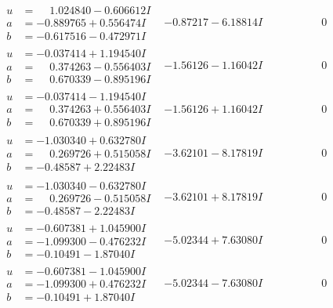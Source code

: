 \documentclass[1p]{elsarticle_modified}
\theoremstyle{definition}
\begin{document}
$$\begin{array}{c|c|c}
\begin{aligned}
u &= \phantom{-}1.024840 - 0.606612 I \\
a &= -0.889765 + 0.556474 I \\
b &= -0.617516 - 0.472971 I\end{aligned}
 & -0.87217 - 6.18814 I & \phantom{-0.000000 } 0 \\ \hline\begin{aligned}
u &= -0.037414 + 1.194540 I \\
a &= \phantom{-}0.374263 - 0.556403 I \\
b &= \phantom{-}0.670339 - 0.895196 I\end{aligned}
 & -1.56126 - 1.16042 I & \phantom{-0.000000 } 0 \\ \hline\begin{aligned}
u &= -0.037414 - 1.194540 I \\
a &= \phantom{-}0.374263 + 0.556403 I \\
b &= \phantom{-}0.670339 + 0.895196 I\end{aligned}
 & -1.56126 + 1.16042 I & \phantom{-0.000000 } 0 \\ \hline\begin{aligned}
u &= -1.030340 + 0.632780 I \\
a &= \phantom{-}0.269726 + 0.515058 I \\
b &= -0.48587 + 2.22483 I\end{aligned}
 & -3.62101 - 8.17819 I & \phantom{-0.000000 } 0 \\ \hline\begin{aligned}
u &= -1.030340 - 0.632780 I \\
a &= \phantom{-}0.269726 - 0.515058 I \\
b &= -0.48587 - 2.22483 I\end{aligned}
 & -3.62101 + 8.17819 I & \phantom{-0.000000 } 0 \\ \hline\begin{aligned}
u &= -0.607381 + 1.045900 I \\
a &= -1.099300 - 0.476232 I \\
b &= -0.10491 - 1.87040 I\end{aligned}
 & -5.02344 + 7.63080 I & \phantom{-0.000000 } 0 \\ \hline\begin{aligned}
u &= -0.607381 - 1.045900 I \\
a &= -1.099300 + 0.476232 I \\
b &= -0.10491 + 1.87040 I\end{aligned}
 & -5.02344 - 7.63080 I & \phantom{-0.000000 } 0 \\ \hline\begin{aligned}

\end{aligned}
\end{array}$$
\end{document}
